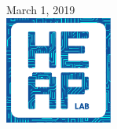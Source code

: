 \begin{titlepage}

{\large March 1, 2019}\\[2cm]


\includegraphics[width=100pt]{./Images/Logo/heaplogo.pdf}\\[1cm]
 

\vfill %

\end{titlepage}



\newpage

\newpage

\newpage

\newpage

%

